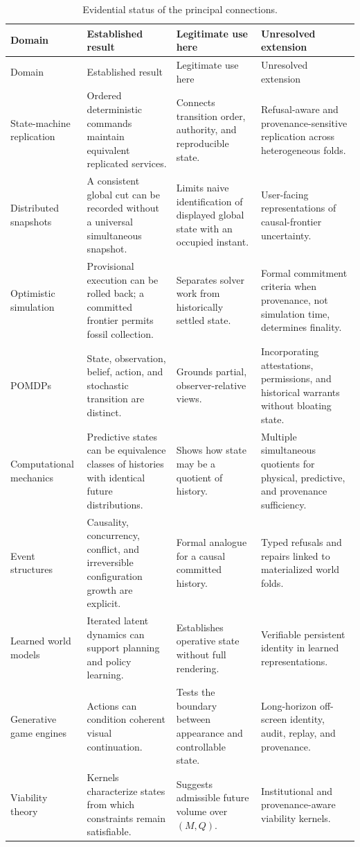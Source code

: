 \documentclass[11pt]{article}
\begin{document}
\small
\begin{longtable}{p{}p{}p{}p{}}
\caption{Evidential status of the principal connections.}\label{tab:evidence}\\
\toprule
Domain & Established result & Legitimate use here & Unresolved extension\\
\midrule
\endfirsthead
\toprule
Domain & Established result & Legitimate use here & Unresolved extension\\
\midrule
\endhead
State-machine replication & Ordered deterministic commands maintain equivalent replicated services. & Connects transition order, authority, and reproducible state. & Refusal-aware and provenance-sensitive replication across heterogeneous folds.\\
\addlinespace
Distributed snapshots & A consistent global cut can be recorded without a universal simultaneous snapshot. & Limits naive identification of displayed global state with an occupied instant. & User-facing representations of causal-frontier uncertainty.\\
\addlinespace
Optimistic simulation & Provisional execution can be rolled back; a committed frontier permits fossil collection. & Separates solver work from historically settled state. & Formal commitment criteria when provenance, not simulation time, determines finality.\\
\addlinespace
POMDPs & State, observation, belief, action, and stochastic transition are distinct. & Grounds partial, observer-relative views. & Incorporating attestations, permissions, and historical warrants without bloating state.\\
\addlinespace
Computational mechanics & Predictive states can be equivalence classes of histories with identical future distributions. & Shows how state may be a quotient of history. & Multiple simultaneous quotients for physical, predictive, and provenance sufficiency.\\
\addlinespace
Event structures & Causality, concurrency, conflict, and irreversible configuration growth are explicit. & Formal analogue for a causal committed history. & Typed refusals and repairs linked to materialized world folds.\\
\addlinespace
Learned world models & Iterated latent dynamics can support planning and policy learning. & Establishes operative state without full rendering. & Verifiable persistent identity in learned representations.\\
\addlinespace
Generative game engines & Actions can condition coherent visual continuation. & Tests the boundary between appearance and controllable state. & Long-horizon off-screen identity, audit, replay, and provenance.\\
\addlinespace
Viability theory & Kernels characterize states from which constraints remain satisfiable. & Suggests admissible future volume over $(M,Q)$. & Institutional and provenance-aware viability kernels.\\
\bottomrule
\end{longtable}
\normalsize
\end{document}
